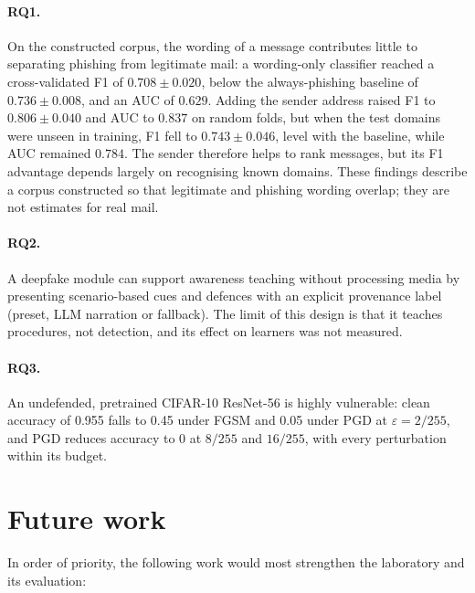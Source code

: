 \paragraph{RQ1.} On the constructed corpus, the wording of a message contributes little to separating phishing from legitimate mail: a wording-only classifier reached a cross-validated F1 of $0.708 \pm 0.020$, below the always-phishing baseline of $0.736 \pm 0.008$, and an AUC of $0.629$. Adding the sender address raised F1 to $0.806 \pm 0.040$ and AUC to $0.837$ on random folds, but when the test domains were unseen in training, F1 fell to $0.743 \pm 0.046$, level with the baseline, while AUC remained $0.784$. The sender therefore helps to rank messages, but its F1 advantage depends largely on recognising known domains. These findings describe a corpus constructed so that legitimate and phishing wording overlap; they are not estimates for real mail.

\paragraph{RQ2.} A deepfake module can support awareness teaching without processing media by presenting scenario-based cues and defences with an explicit provenance label (preset, LLM narration or fallback). The limit of this design is that it teaches procedures, not detection, and its effect on learners was not measured.

\paragraph{RQ3.} An undefended, pretrained CIFAR-10 ResNet-56 is highly vulnerable: clean accuracy of 0.955 falls to 0.45 under FGSM and 0.05 under PGD at $\varepsilon = 2/255$, and PGD reduces accuracy to 0 at $8/255$ and $16/255$, with every perturbation within its budget.

\section{Future work}
\label{sec:future}

In order of priority, the following work would most strengthen the laboratory and its evaluation:


